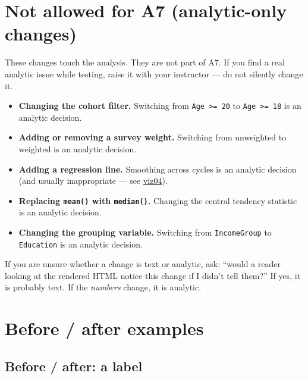 \documentclass[
  letterpaper,
  DIV=11,
  numbers=noendperiod,
  oneside]{scrreprt}
\providecommand{\tightlist}{%
  \setlength{\itemsep}{0pt}\setlength{\parskip}{0pt}}
\begin{document}
\section*{Not allowed for A7 (analytic-only
changes)}\label{not-allowed-for-a7-analytic-only-changes}


These changes touch the analysis. They are not part of A7. If you find a
real analytic issue while testing, raise it with your instructor --- do
not silently change it.

\begin{itemize}
\tightlist
\item
  \textbf{Changing the cohort filter.} Switching from
  \texttt{Age\ \textgreater{}=\ 20} to \texttt{Age\ \textgreater{}=\ 18}
  is an analytic decision.
\item
  \textbf{Adding or removing a survey weight.} Switching from unweighted
  to weighted is an analytic decision.
\item
  \textbf{Adding a regression line.} Smoothing across cycles is an
  analytic decision (and usually inappropriate --- see
  \hyperref[how-a-plot-can-mislead]{viz04}).
\item
  \textbf{Replacing \texttt{mean()} with \texttt{median()}.} Changing
  the central tendency statistic is an analytic decision.
\item
  \textbf{Changing the grouping variable.} Switching from
  \texttt{IncomeGroup} to \texttt{Education} is an analytic decision.
\end{itemize}

If you are unsure whether a change is text or analytic, ask: ``would a
reader looking at the rendered HTML notice this change if I didn't tell
them?'' If yes, it is probably text. If the \emph{numbers} change, it is
analytic.

\section*{Before / after examples}\label{before-after-examples}


\subsection*{Before / after: a label}\label{before-after-a-label}
\end{document}
